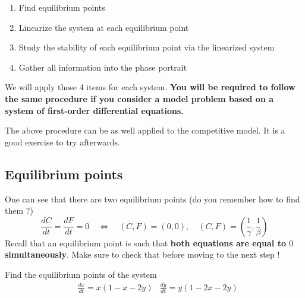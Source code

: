 \begin{enumerate}
\item Find equilibrium points
\item Linearize the system at each equilibrium point
\item Study the stability of each equilibrium point via the linearized system
\item Gather all information into the phase portrait
\end{enumerate}
We will apply those 4 items for each system. \textbf{You will be required to follow the same procedure if you consider a model problem based on a system of first-order differential equations.}\\

\begin{remark}
The above procedure can be as well applied to the competitive model. It is a good exercise to try afterwards.
\end{remark}

\subsection{Equilibrium points} One can see that there are two equilibrium points (do you remember how to find them ?)
\[ \displaystyle \frac{dC}{dt} =\displaystyle \frac{dF}{dt}  =  0  \quad \Longleftrightarrow \quad (C,F) = (0,0), \quad  (C,F) = (\frac{1}{\gamma},\frac{1}{\beta}) \]
Recall that an equilibrium point is such that \textbf{both equations are equal to $0$ simultaneously}. Make sure to check that before moving to the next step ! 
 \begin{Exercise}
Find the equilibrium points of the system 
\[ \begin{aligned}
&\displaystyle \frac{dx}{dt} = x \left( 1 -x - 2y \right)  
&\displaystyle \frac{dy}{dt} = y \left( 1 -2x -2 y \right) 
\end{aligned}
\]
  \dotfill

\dotfill

\dotfill

\dotfill

\dotfill

\dotfill

\dotfill

\dotfill

\dotfill

\dotfill
 \end{Exercise}
 
